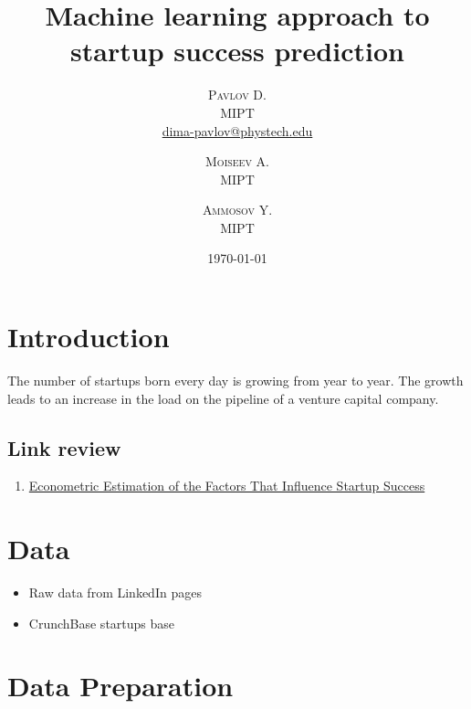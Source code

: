 \documentclass[12pt]{article}
\title{\textbf{\Huge{Machine learning approach to startup success prediction}}}
\author{%
\textsc{Pavlov D.} \\[1ex] 
\normalsize MIPT\\ 
\normalsize \href{mailto:dima-pavlov@phystech.edu}{dima-pavlov@phystech.edu}
\and 
\textsc{Moiseev A.} \\[1ex] 
\normalsize MIPT
\and 
\textsc{Ammosov Y.} \\[1ex] 
\normalsize MIPT
}
\date{\today}
\theoremstyle{plain}
\theoremstyle{definition}
\begin{document}
\maketitle

\clearpage

\section{Introduction}



The number of startups born every day is growing from year to year. 
The growth leads to an increase in the load on the pipeline of a venture capital company. 

\subsection{Link review}

\begin{enumerate}
    \item \href{https://www.mdpi.com/2071-1050/13/4/2242/htm}{Econometric Estimation of the Factors That Influence Startup Success}
\end{enumerate}

\section{Data}
    
\begin{itemize}
    \item Raw data from LinkedIn pages
    \item CrunchBase startups base
\end{itemize}

\section{Data Preparation}
\end{document}

